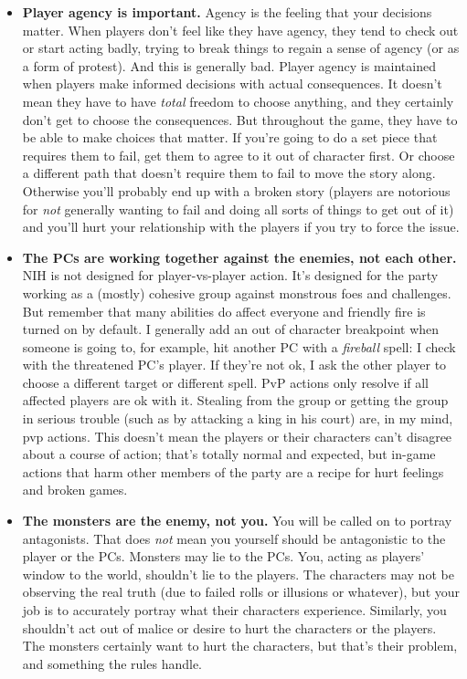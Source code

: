 \documentclass[10pt,twoside,openany,bg=none]{dndbook}
\begin{document}
\begin{itemize}
    \item[] \textbf{Player agency is important.} Agency is the feeling that your decisions matter. When players don't feel like they have agency, they tend to check out or start acting badly, trying to break things to regain a sense of agency (or as a form of protest). And this is generally bad. Player agency is maintained when players make informed decisions with actual consequences. It doesn't mean they have to have \textit{total} freedom to choose anything, and they certainly don't get to choose the consequences. But throughout the game, they have to be able to make choices that matter. If you're going to do a set piece that requires them to fail, get them to agree to it out of character first. Or choose a different path that doesn't require them to fail to move the story along. Otherwise you'll probably end up with a broken story (players are notorious for \textit{not} generally wanting to fail and doing all sorts of things to get out of it) and you'll hurt your relationship with the players if you try to force the issue.
    \item[] \textbf{The PCs are working together against the enemies, not each other.} NIH is not designed for player-vs-player action. It's designed for the party working as a (mostly) cohesive group against monstrous foes and challenges. But remember that many abilities do affect everyone and friendly fire is turned on by default. I generally add an out of character breakpoint when someone is going to, for example, hit another PC with a \textit{fireball} spell: I check with the threatened PC's player. If they're not ok, I ask the other player to choose a different target or different spell. PvP actions only resolve if all affected players are ok with it. Stealing from the group or getting the group in serious trouble (such as by attacking a king in his court) are, in my mind, pvp actions. This doesn't mean the players or their characters can't disagree about a course of action; that's totally normal and expected, but in-game actions that harm other members of the party are a recipe for hurt feelings and broken games.
    \item[] \textbf{The monsters are the enemy, not you.} You will be called on to portray antagonists. That does \textit{not} mean you yourself should be antagonistic to the player or the PCs. Monsters may lie to the PCs. You, acting as players' window to the world, shouldn't lie to the players. The characters may not be observing the real truth (due to failed rolls or illusions or whatever), but your job is to accurately portray what their characters experience. Similarly, you shouldn't act out of malice or desire to hurt the characters or the players. The monsters certainly want to hurt the characters, but that's their problem, and something the rules handle.

\end{itemize}
\end{document}
